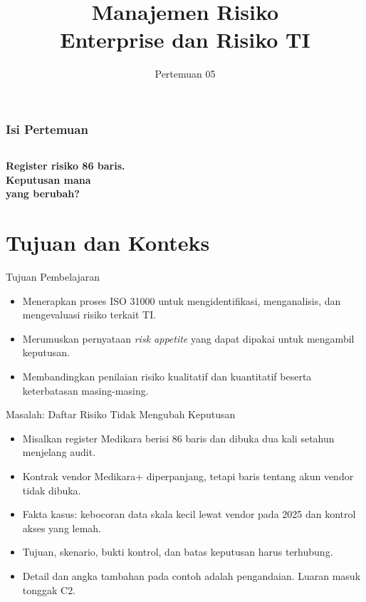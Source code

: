 \documentclass[aspectratio=169, table, 12pt]{beamer}
\title{\Huge Manajemen Risiko\\ \vspace{10pt} Enterprise dan Risiko TI}
\date{Pertemuan 05}
\begin{document}
\frame{\titlepage}

\begin{frame}
  \frametitle{Isi Pertemuan}
  \vspace{14pt}
  \begin{columns}[t]
    {\small\tableofcontents[sections={1-4}]}

    {\small\tableofcontents[sections={5-8}]}
  \end{columns}
\end{frame}

\begin{frame}{\hfill}
  \centering
  \Huge{\textbf{Register risiko 86 baris.\\Keputusan mana\\yang berubah?}}
\end{frame}

\section{Tujuan dan Konteks}

\begin{frame}{{\Large Tujuan Pembelajaran}}
  \vspace{10pt}
  \begin{itemize}
    \item Menerapkan proses ISO 31000 untuk mengidentifikasi, menganalisis, dan mengevaluasi risiko
          terkait TI.
    \item Merumuskan pernyataan \textit{risk appetite} yang dapat dipakai untuk mengambil keputusan.
    \item Membandingkan penilaian risiko kualitatif dan kuantitatif beserta keterbatasan
          masing-masing.
  \end{itemize}
\end{frame}

\begin{frame}{{\Large Masalah: Daftar Risiko Tidak Mengubah Keputusan}}
  \vspace{6pt}
  \small
  \begin{itemize}
    \item Misalkan register Medikara berisi 86 baris dan dibuka dua kali setahun menjelang audit.
    \item Kontrak vendor Medikara+ diperpanjang, tetapi baris tentang akun vendor tidak dibuka.
    \item Fakta kasus: kebocoran data skala kecil lewat vendor pada 2025 dan kontrol akses yang lemah.
    \item Tujuan, skenario, bukti kontrol, dan batas keputusan harus terhubung.
    \item Detail dan angka tambahan pada contoh adalah pengandaian. Luaran masuk tonggak C2.
  \end{itemize}
\end{frame}
\end{document}
